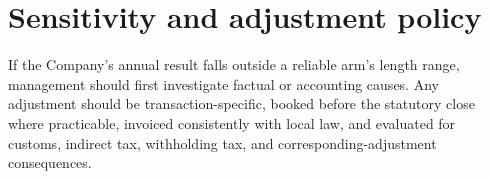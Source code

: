 \section{Sensitivity and adjustment policy}
If the Company's annual result falls outside a reliable arm's length range,
management should first investigate factual or accounting causes. Any adjustment
should be transaction-specific, booked before the statutory close where
practicable, invoiced consistently with local law, and evaluated for customs,
indirect tax, withholding tax, and corresponding-adjustment consequences.

